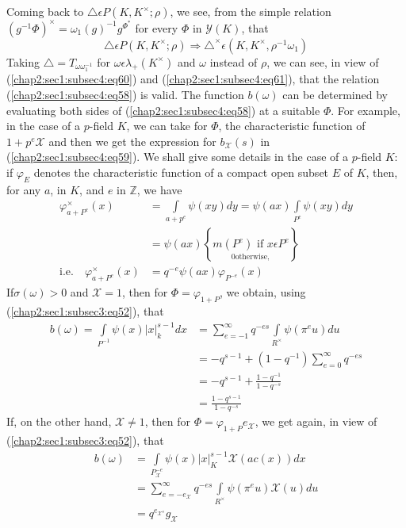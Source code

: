 Coming back to $\triangle\epsilon P(K,K^{\times}; \rho)$, we see, from
the simple relation
$(g^{-1}\Phi)^{\times}=\omega_{1}(g)^{-1}g^{\Phi^{\ast}}$ for every $\Phi$
in $\mathscr{Y}(K)$, that
\begin{equation*}
  \triangle \epsilon P(K, K^{\times};\rho) \Rightarrow
  \triangle^{\times}
  \epsilon(K,K^{\times},\rho^{-1}\omega_{1})
\end{equation*}
Taking $\triangle=T_{\omega\omega_{1}^{-1}}$ for  $\omega\epsilon
\lambda_{+}(K^{\times}) $ and $\omega$ instead of $\rho$, we can see, in
view of (\ref{chap2:sec1:subsec4:eq60}) and
(\ref{chap2:sec1:subsec4:eq61}), that the relation
(\ref{chap2:sec1:subsec4:eq58}) is valid. The 
function $b(\omega)$ can be determined by evaluating both sides of
(\ref{chap2:sec1:subsec4:eq58}) at a suitable $\Phi$. For example, in
the case of a  $p$-field 
$K$, we can take for $\Phi$, the characteristic function of
$1+p^{e}\mathcal{X}$ and then we get the expression for
$b_{\mathcal{X}}(s)$ in (\ref{chap2:sec1:subsec4:eq59}). We shall give some details in the case
of a $p$-field $K$: if $\varphi_{E}$ denotes the characteristic function
of a compact open subset $E$ of $K$, then, for any $a$, in $K$, and
$e$ in $\mathbb{Z}$, we have
\begin{align*}
  \varphi_{a+P^{e}}^{\times}(x)& =\int\limits_{a+p^{e}}\psi(xy)dy 
  =\psi(ax)\int\limits_{P^{e}}\psi(xy)dy\\
  & =\psi(ax)\left\{\underset{\displaystyle{0 \text{
        otherwise},}}{m(P^{e})\text{ if }x\epsilon P^{e}}\right\}\\
  \text{i.e.}\quad  \varphi_{a+P^{e}}^{\times}(x)
  & = q^{-e}\psi(ax)\varphi_{P^{-e}}(x)\tag{62}\label{chap2:sec1:subsec4:eq62}
\end{align*}
If\pageoriginale $\sigma (\omega)>0$ and $\mathcal{X}=1$, then for
$\Phi=\varphi_{1+P}$, we obtain, using (\ref{chap2:sec1:subsec3:eq52}), that 
\begin{align*}
  b(\omega)=\int\limits_{P^{-1}}\psi(x)|x|_{k}^{s-1}dx
  & =\sum\limits_{e=-1}^{\infty}q^{-es}\int\limits_{R^{\times}}\psi(\pi^{e}u)du\\
  & =-q^{s-1}+(1-q^{-1})\sum\limits_{e=0}^{\infty}q^{-es}\\
  & =-q^{s-1}+\frac{1-q^{-1}}{1-q^{-s}}\\
  & =\frac{1-q^{s-1}}{1-q^{-s}}
\end{align*}
 If, on the other hand, $\mathcal{X}\neq 1$, then for
 $\Phi=\varphi_{1+P} e_{\mathcal{X}}$, we get again, in view of
   (\ref{chap2:sec1:subsec3:eq52}), that 
\begin{align*}
  b(\omega)&
  =\int\limits_{P^{-e}_{\mathcal{X}}}\psi(x)|x|_{K}^{s-1}\mathcal{X}(ac(x))dx\\ 
  & =\sum\limits_{e=-e_{\mathcal{X}}}^{\infty}q^{-es}
  \int\limits_{R^{\times}}\psi(\pi^{e}u)\mathcal{X}(u)du\\
  & =q^{e_{\mathcal{X}^{s}}} g_{\mathcal{X}}
\end{align*}

